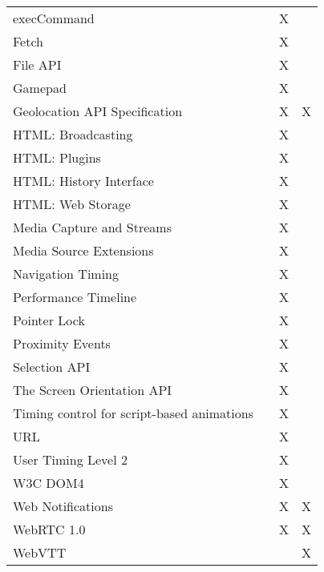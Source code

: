 \begin{table}[th]
{\begin{tabular}{ l | c c c }
          execCommand                                   &   & X & \\
          Fetch                                         &   & X & \\
          File API                                      &   & X & \\
          Gamepad                                       &   & X & \\
          Geolocation API Specification                 &   & X & X \\
          HTML: Broadcasting                            &   & X & \\
          HTML: Plugins                                 &   & X & \\
          HTML: History Interface                       &   & X & \\
          HTML: Web Storage                             &   & X & \\
          Media Capture and Streams                     &   & X & \\
          Media Source Extensions                       &   & X & \\
          Navigation Timing                             &   & X & \\
          Performance Timeline                          &   & X & \\
          Pointer Lock                                  &   & X & \\
          Proximity Events                              &   & X & \\
          Selection API                                 &   & X & \\
          The Screen Orientation API                    &   & X & \\
          Timing control for script-based animations    &   & X & \\
          URL                                           &   & X & \\
          User Timing Level 2                           &   & X & \\
          W3C DOM4                                      &   & X & \\
          Web Notifications                             &   & X & X \\
          WebRTC 1.0                                    &   & X & X \\
          WebVTT                                        &   &   & X \\

\end{tabular}}
\end{table}
